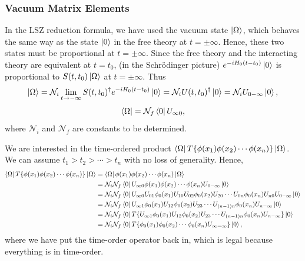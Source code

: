 \documentclass[11pt]{article}
\theoremstyle{definition}
\begin{document}
\subsubsection{Vacuum Matrix Elements}
In the LSZ reduction formula, we have used the vacuum state $\ket{\Omega}$, which behaves the same way as the state $\ket{0}$ in the free theory at $t= \pm \infty$. Hence, these two states must be proportional at $t= \pm \infty$. Since the free theory and the interacting theory are equivalent at $t = t_0$, (in the Schrödinger picture) $e^{-iH_0(t-t_0)}\ket{0}$ is proportional to $S(t,t_0)\ket{\Omega}$ at $t = \pm \infty$. Thus
\begin{equation}
    \ket{\Omega} = \mathcal{N}_i\lim_{t\rightarrow-\infty} S(t, t_0)^\dagger e^{-iH_0(t-t_0)}\ket{0} = \mathcal{N}_i U(t,t_0)^\dagger\ket{0} = \mathcal{N}_i U_{0-\infty}\ket{0},
\end{equation}
\begin{equation}
    \bra{\Omega} = \mathcal{N}_f \bra{0}U_{\infty0},
\end{equation}
where $\mathcal{N}_i$ and $\mathcal{N}_f$ are constants to be determined.

We are interested in the time-ordered product $\bra{\Omega}T\{\phi(x_1) \phi(x_2) \cdots  \phi(x_n)\}\ket{\Omega}$. We can assume $t_1 > t_2 > \cdots > t_n$ with no loss of generality. Hence,
\begin{equation}
    \begin{aligned}
        \bra{\Omega}T\{\phi(x_1) \phi(x_2) \cdots  \phi(x_n)\}\ket{\Omega} &= \bra{\Omega}\phi(x_1) \phi(x_2) \cdots  \phi(x_n)\ket{\Omega}\\
        &= \mathcal{N}_i \mathcal{N}_f \bra{0}U_{\infty0}\phi(x_1) \phi(x_2) \cdots  \phi(x_n)U_{0-\infty}\ket{0}\\
        &=  \mathcal{N}_i \mathcal{N}_f \bra{0}U_{\infty0} U_{01} \phi_0(x_1) U_{10} U_{02}\phi_0(x_2) U_{20} \cdots U_{0n} \phi_0(x_n) U_{n0}U_{0-\infty}\ket{0}\\
        &= \mathcal{N}_i \mathcal{N}_f \bra{0}U_{\infty1} \phi_0(x_1) U_{12} \phi_0(x_2) U_{23} \cdots U_{(n-1)n} \phi_0(x_n) U_{n-\infty}\ket{0}\\
        &= \mathcal{N}_i \mathcal{N}_f \bra{0}T\{U_{\infty1} \phi_0(x_1) U_{12} \phi_0(x_2) U_{23} \cdots U_{(n-1)n} \phi_0(x_n) U_{n-\infty}\}\ket{0}\\
        &= \mathcal{N}_i \mathcal{N}_f \bra{0}T\{\phi_0(x_1)\phi_0(x_2) \cdots \phi_0(x_n) U_{\infty-\infty}\}\ket{0},
    \end{aligned}
\end{equation}
where we have put the time-order operator back in, which is legal because everything is in time-order. 
\end{document}
